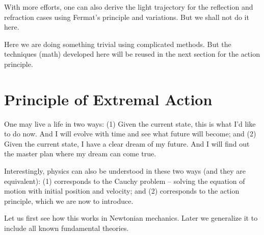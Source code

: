 With more efforts, one can also derive the light trajectory for the reflection and refraction cases using Fermat's principle and variations. But we shall not do it here. 

Here we are doing something trivial using complicated methods. But the techniques (math) developed here will be reused in the next section for the action principle. 

\section{Principle of Extremal Action}

One may live a life in two ways: (1) Given the current state, this is what I'd like to do now. And I will evolve with time and see what future will become; and (2) Given the current state, I have a clear dream of my future. And I will find out the master plan where my dream can come true.

Interestingly, physics can also be understood in these two ways (and they are equivalent): (1) corresponds to the Cauchy problem -- solving the equation of motion with initial position and velocity; and (2) corresponds to the action principle, which we are now to introduce.


Let us first see how this works in Newtonian mechanics. Later we generalize it to include all known fundamental theories.

